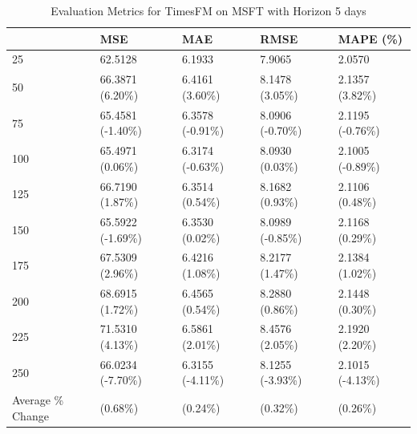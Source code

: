 \begin{table}
\caption{Evaluation Metrics for TimesFM on MSFT with Horizon 5 days}
\label{tab:fm_MSFT_h5_metrics}
\begin{tabular}{lllll}
\toprule
 & MSE & MAE & RMSE & MAPE (\%) \\
\midrule
25 & 62.5128 & 6.1933 & 7.9065 & 2.0570 \\
50 & 66.3871 (6.20\%) & 6.4161 (3.60\%) & 8.1478 (3.05\%) & 2.1357 (3.82\%) \\
75 & 65.4581 (-1.40\%) & 6.3578 (-0.91\%) & 8.0906 (-0.70\%) & 2.1195 (-0.76\%) \\
100 & 65.4971 (0.06\%) & 6.3174 (-0.63\%) & 8.0930 (0.03\%) & 2.1005 (-0.89\%) \\
125 & 66.7190 (1.87\%) & 6.3514 (0.54\%) & 8.1682 (0.93\%) & 2.1106 (0.48\%) \\
150 & 65.5922 (-1.69\%) & 6.3530 (0.02\%) & 8.0989 (-0.85\%) & 2.1168 (0.29\%) \\
175 & 67.5309 (2.96\%) & 6.4216 (1.08\%) & 8.2177 (1.47\%) & 2.1384 (1.02\%) \\
200 & 68.6915 (1.72\%) & 6.4565 (0.54\%) & 8.2880 (0.86\%) & 2.1448 (0.30\%) \\
225 & 71.5310 (4.13\%) & 6.5861 (2.01\%) & 8.4576 (2.05\%) & 2.1920 (2.20\%) \\
250 & 66.0234 (-7.70\%) & 6.3155 (-4.11\%) & 8.1255 (-3.93\%) & 2.1015 (-4.13\%) \\
Average \% Change & (0.68\%) & (0.24\%) & (0.32\%) & (0.26\%) \\
\bottomrule
\end{tabular}
\end{table}

